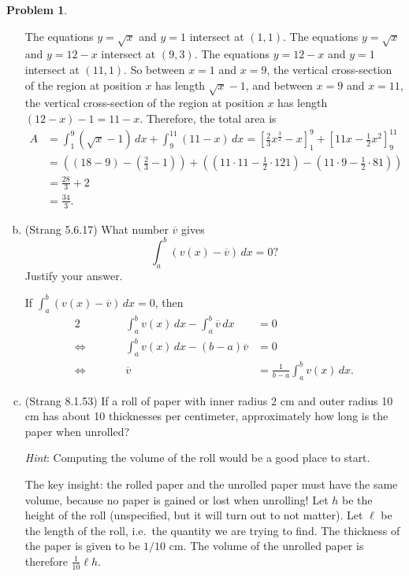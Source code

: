 \documentclass[11pt,oneside]{amsart}
\theoremstyle{definition}
\newtheorem{problem}{Problem}
\begin{document}
\begin{problem}
\begin{enumerate}[(a)]
\begin{solution}
\begin{center}
                \end{center}
                The equations $y=\sqrt x$ and $y=1$ intersect at $(1,1)$. The equations $y=\sqrt x$ and $y=12-x$ intersect at $(9,3)$. The equations $y=12-x$ and $y=1$ intersect at $(11,1)$. So between $x=1$ and $x=9$, the vertical cross-section of the region at position $x$ has length $\sqrt x-1$, and between $x=9$ and $x=11$, the vertical cross-section of the region at position $x$ has length $(12-x)-1=11-x$. Therefore, the total area is
                \[\begin{split}
                    A &=\int_1^9 (\sqrt x-1)\,dx+\int_9^{11}(11-x)\,dx =\left[\frac 23x^{\frac 32}-x\right]_1^9+\left[11x-\frac 12x^2\right]_9^{11}\\
                    &= \left(\left(18-9\right)-\left(\frac 23-1\right)\right)+\left( \left(11\cdot 11-\frac 12\cdot 121\right) -\left(11\cdot 9-\frac 12\cdot 81\right)\right)\\
                    &= \frac{28}3+2\\
                    &=\frac{34}3.
                \end{split}\]
            \end{solution}
            \item (Strang 5.6.17) What number $\overline v$ gives
            \[\int_a^b(v(x)-\overline v)\,dx=0?\]
            Justify your answer.
            \begin{solution}
                If $\int_a^b(v(x)-\overline v)\,dx=0$, then
                \begin{alignat*}{2}
                    &\qquad& \int_a^b v(x)\,dx-\int_a^b\overline v\,dx &= 0\\
                    \iff&& \int_a^b v(x)\,dx -(b-a)\overline v &= 0\\
                    \iff&& \overline v &= \frac 1{b-a}\int_a^b v(x)\,dx.
                \end{alignat*}
            \end{solution}
            \item (Strang 8.1.53) If a roll of paper with inner radius 2 cm and outer radius 10 cm has about 10 thicknesses per centimeter, approximately how long is the paper when unrolled?
        
            \emph{Hint}: Computing the volume of the roll would be a good place to start.
            \begin{solution}
                The key insight: the rolled paper and the unrolled paper must have the same volume, because no paper is gained or lost when unrolling! Let $h$ be the height of the roll (unspecified, but it will turn out to not matter). Let $\ell$ be the length of the roll, i.e.\ the quantity we are trying to find. The thickness of the paper is given to be $1/10\textrm{ cm}$. The volume of the unrolled paper is therefore $\frac 1{10}\ell h$.


\end{solution}
\end{enumerate}
\end{problem}
\end{document}
